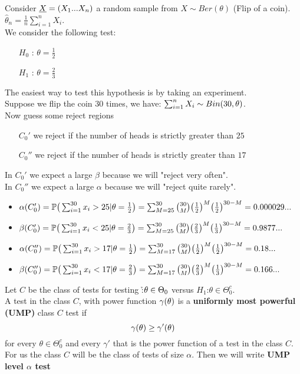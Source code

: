 \begin{eg}
	Consider $\underline X=(X_1 ... X_n)$ a random sample from $X\sim Ber(\theta)$ (Flip of a coin).\\
	$\hat \theta_n=\frac{1}{n}\sum_{i=1}^{n}X_i$.\\
	We consider the following test:
	\begin{itemize}
		\item[$H_0$]: $\theta=\frac{1}{2}$
		\item[$H_1$]: $\theta=\frac{2}{3}$
	\end{itemize}
	The easiest way to test this hypothesis is by taking an experiment.\\
	Suppose we flip the coin $30$ times, we have:
	$\sum_{i=1}^n X_i\sim Bin(30,\theta)$.\\
	Now guess some reject regions
	\begin{itemize}
		\item[$C_0'$] we reject \h if the number of heads is strictly greater than $25$
		\item[$C_0''$] we reject \h if the number of heads is strictly greater than $17$
	\end{itemize}
	In $C_0'$ we expect a large $\beta$ because we will "reject very often".\\
	In $C_0''$ we expect a large $\alpha$ because we will "reject quite rarely".\\
	\begin{itemize}
		\item $\alpha(C_0') = \mathbb{P} \big( \sum_{i=1}^{30} x_i > 25 | \theta = \frac{1}{2} \big) = \sum_{M=25}^{30} \binom{30}{M} \big(\frac{1}{2}\big)^M \big( \frac{1}{2} \big)^{30-M}=0.000029...$
		\item $\beta(C_0') = \mathbb{P} \big( \sum_{i=1}^{30} x_i < 25 | \theta = \frac{2}{3} \big) = \sum_{M=25}^{30} \binom{30}{M} \big(\frac{2}{3}\big)^M \big( \frac{1}{3} \big)^{30-M}=0.9877...$
		\item $\alpha(C_0'') = \mathbb{P} \big( \sum_{i=1}^{30} x_i > 17 | \theta = \frac{1}{2} \big) = \sum_{M=17}^{30} \binom{30}{M} \big(\frac{1}{2}\big)^M \big( \frac{1}{2} \big)^{30-M}=0.18...$
		\item $\beta(C_0'') = \mathbb{P} \big( \sum_{i=1}^{30} x_i < 17 | \theta = \frac{2}{3} \big) = \sum_{M=17}^{30} \binom{30}{M} \big(\frac{2}{3}\big)^M \big( \frac{1}{3} \big)^{30-M}=0.166...$
	\end{itemize}
\end{eg}
\begin{defi}
	Let $C$ be the class of tests for testing \h :$\theta \in \Theta_0$ versus $H_1$:$\theta \in \Theta_0^c$.\\
	A test in the class $C$, with power function $\gamma(\theta)$ is a \textbf{uniformly most powerful (UMP)} class $C$ test if
	$$\gamma(\theta)\geq \gamma'(\theta)$$
	for every $\theta \in \Theta_0^c$ and every $\gamma'$ that is the power function of a test in the class $C$.\\
	For us the class $C$ will be the class of tests of size $\alpha$. Then we will write \textbf{UMP level $\alpha$ test}
\end{defi}
